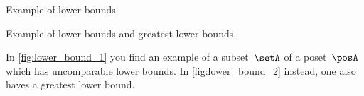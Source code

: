 \begin{solution}
    \begin{marginfigure}
        \centering
        \caption{Example of lower bounds. \label{fig:lower_bound_1}}
    \end{marginfigure}
    \begin{marginfigure}
        \centering
        \caption{Example of lower bounds and greatest lower bounds. \label{fig:lower_bound_2}}
    \end{marginfigure}

    In \cref{fig:lower_bound_1} you find an example of a subset~$\setA$ of a poset~$\posA$ which has uncomparable lower bounds.
    In \cref{fig:lower_bound_2} instead, one also haves a greatest lower bound.

\end{solution}

